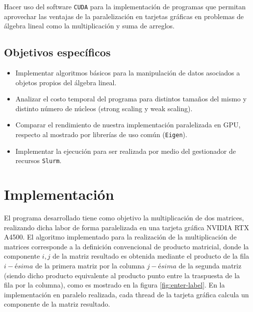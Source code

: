 \documentclass[journal, onecolumn, a4paper, 11pt]{IEEEtran}
\begin{document}
Hacer uso del software \texttt{CUDA} para la implementación de programas que permitan aprovechar las ventajas de la paralelización en tarjetas gráficas en problemas de álgebra lineal como la multiplicación y suma de arreglos.

\subsection{\textbf{Objetivos específicos}}

\begin{itemize}
    \item Implementar algoritmos básicos para la manipulación de datos asociados a objetos propios del álgebra lineal.
    \item Analizar el costo temporal del programa para distintos tamaños del mismo y distinto número de núcleos (strong scaling y weak scaling).
    \item Comparar el rendimiento de nuestra implementación paralelizada en GPU, respecto al mostrado por librerías de uso común (\texttt{Eigen}).
    \item Implementar la ejecución para ser realizada por medio del gestionador de recursos \texttt{Slurm}.
\end{itemize}

\section{\textbf{Implementación}}

El programa desarrollado tiene como objetivo la multiplicación de dos matrices, realizando dicha labor de forma paralelizada en una tarjeta gráfica NVIDIA RTX A4500. El algoritmo implementado para la realización de la multiplicación de matrices corresponde a la definición convencional de producto matricial, donde la componente $i,j$ de la matriz resultado es obtenida mediante el producto de la fila $i-ésima$ de la primera matriz por la columna $j-ésima$ de la segunda matriz (siendo dicho producto equivalente al producto punto entre la traspuesta de la fila por la columna), como es mostrado en la figura \ref{fig:enter-label}. En la implementación en paralelo realizada, cada thread de la tarjeta gráfica calcula un componente de la matriz resultado.
\end{document}
